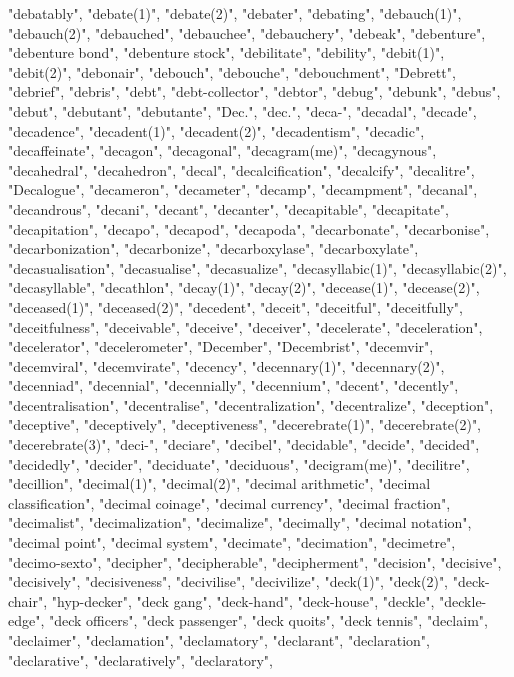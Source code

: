"debatably",
"debate(1)",
"debate(2)",
"debater",
"debating",
"debauch(1)",
"debauch(2)",
"debauched",
"debauchee",
"debauchery",
"debeak",
"debenture",
"debenture bond",
"debenture stock",
"debilitate",
"debility",
"debit(1)",
"debit(2)",
"debonair",
"debouch",
"debouche",
"debouchment",
"Debrett",
"debrief",
"debris",
"debt",
"debt-collector",
"debtor",
"debug",
"debunk",
"debus",
"debut",
"debutant",
"debutante",
"Dec.",
"dec.",
"deca-",
"decadal",
"decade",
"decadence",
"decadent(1)",
"decadent(2)",
"decadentism",
"decadic",
"decaffeinate",
"decagon",
"decagonal",
"decagram(me)",
"decagynous",
"decahedral",
"decahedron",
"decal",
"decalcification",
"decalcify",
"decalitre",
"Decalogue",
"decameron",
"decameter",
"decamp",
"decampment",
"decanal",
"decandrous",
"decani",
"decant",
"decanter",
"decapitable",
"decapitate",
"decapitation",
"decapo",
"decapod",
"decapoda",
"decarbonate",
"decarbonise",
"decarbonization",
"decarbonize",
"decarboxylase",
"decarboxylate",
"decasualisation",
"decasualise",
"decasualize",
"decasyllabic(1)",
"decasyllabic(2)",
"decasyllable",
"decathlon",
"decay(1)",
"decay(2)",
"decease(1)",
"decease(2)",
"deceased(1)",
"deceased(2)",
"decedent",
"deceit",
"deceitful",
"deceitfully",
"deceitfulness",
"deceivable",
"deceive",
"deceiver",
"decelerate",
"deceleration",
"decelerator",
"decelerometer",
"December",
"Decembrist",
"decemvir",
"decemviral",
"decemvirate",
"decency",
"decennary(1)",
"decennary(2)",
"decenniad",
"decennial",
"decennially",
"decennium",
"decent",
"decently",
"decentralisation",
"decentralise",
"decentralization",
"decentralize",
"deception",
"deceptive",
"deceptively",
"deceptiveness",
"decerebrate(1)",
"decerebrate(2)",
"decerebrate(3)",
"deci-",
"deciare",
"decibel",
"decidable",
"decide",
"decided",
"decidedly",
"decider",
"deciduate",
"deciduous",
"decigram(me)",
"decilitre",
"decillion",
"decimal(1)",
"decimal(2)",
"decimal arithmetic",
"decimal classification",
"decimal coinage",
"decimal currency",
"decimal fraction",
"decimalist",
"decimalization",
"decimalize",
"decimally",
"decimal notation",
"decimal point",
"decimal system",
"decimate",
"decimation",
"decimetre",
"decimo-sexto",
"decipher",
"decipherable",
"decipherment",
"decision",
"decisive",
"decisively",
"decisiveness",
"decivilise",
"decivilize",
"deck(1)",
"deck(2)",
"deck-chair",
"hyp-decker",
"deck gang",
"deck-hand",
"deck-house",
"deckle",
"deckle-edge",
"deck officers",
"deck passenger",
"deck quoits",
"deck tennis",
"declaim",
"declaimer",
"declamation",
"declamatory",
"declarant",
"declaration",
"declarative",
"declaratively",
"declaratory",
